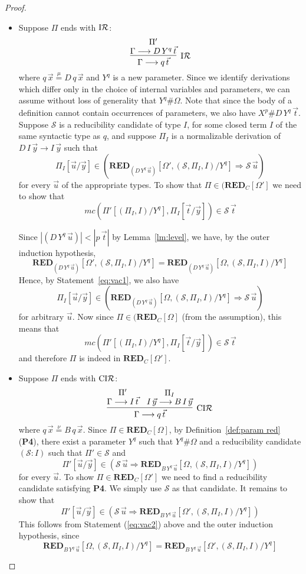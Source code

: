 \documentclass[preprint]{elsarticle}
\def\Sscr{{\mathcal S}}
\newcommand{\Seq}[2]{#1\longrightarrow #2}
\newcommand{\defmu}{\stackrel{\mu}{=}}
\newcommand{\defnu}{\stackrel{\nu}{=}}
\newcommand{\indR}{{\rm I}{\cal R}}
\newcommand{\coindR}{{\rm CI}{\cal R}}
\def\RED{{\mathbf{RED}}}
\begin{document}
\begin{proof}
\begin{itemize}
\item Suppose $\Pi$ ends with $\indR$:
$$
\infer[\indR]
{\Seq {\Gamma} {q\,\vec t}}
{\deduce{\Seq \Gamma {D\,Y^q\,\vec t}}{\Pi'}}
$$
where $q\,\vec x \defmu D\,q\,\vec x$ and $Y^q$ is a new parameter.
Since we identify derivations which differ only in the choice of
internal variables and parameters, we can assume without loss of generality
that $Y^q \# \Omega$. Note that since the body of a definition cannot
contain occurrences of parameters, we also have $X^p \# D\,Y^q\,\vec t$. 
Suppose $\Sscr$ is a reducibility candidate of type $I$, for some
closed term $I$ of the same syntactic type as $q$, and suppose
$\Pi_I$ is a normalizable derivation of $\Seq {D\,I\,\vec y}{I\,\vec y}$
such that
\begin{equation}
\label{eq:vac1}
\Pi_I[\vec u/\vec y] \in (
\RED_{(D\,Y^q\,\vec u)}[\Omega', (\Sscr,\Pi_I, I)/Y^q] \Rightarrow \Sscr
\,\vec u) 
\end{equation}
for every $\vec u$ of the appropriate types. To show that $\Pi \in (\RED_C[\Omega']$
we need to show that 
$$mc(\Pi'[(\Pi_I,I)/Y^q], \Pi_I[\vec t/ \vec y]) \in \Sscr\,\vec t$$ 

Since $|(D\,Y^q\,\vec u)| < |p\,\vec t|$ by Lemma~\ref{lm:level}, we have, by the outer induction hypothesis, 
$$
\RED_{(D\,Y^q\,\vec u)}[\Omega', (\Sscr,\Pi_I, I)/Y^q] 
=
\RED_{(D\,Y^q\,\vec u)}[\Omega, (\Sscr,\Pi_I, I)/Y^q] 
$$
Hence, by Statement~\ref{eq:vac1}, we also have
$$
\Pi_I[\vec u/\vec y] \in (
\RED_{(D\,Y^q\,\vec u)}[\Omega, (\Sscr,\Pi_I, I)/Y^q] \Rightarrow \Sscr \,\vec u)
$$
for arbitrary $\vec u$.  
Now since $\Pi \in (\RED_C[\Omega]$ (from the assumption), this means
that 
$$
mc(\Pi'[(\Pi_I,I)/Y^q], \Pi_I[\vec t/ \vec y]) \in \Sscr\,\vec t
$$
and therefore $\Pi$ is indeed in $\RED_C[\Omega']$. 

\item Suppose $\Pi$ ends with $\coindR$:
$$
\infer[\coindR]
{\Seq \Gamma {q\,\vec t}}
{
  \deduce{\Seq \Gamma {I\,\vec t}}{\Pi'}
  &
  \deduce
  {\Seq {I\,\vec y}{B\,I\,\vec y}}
  {\Pi_I}
}
$$
where $q\,\vec x \defnu B\,q\,\vec x$. 
Since $\Pi \in \RED_C[\Omega]$, by Definition~\ref{def:param red} ({\bf P4}),
there exist a parameter $Y^q$ such
that $Y^q \# \Omega$ and a reducibility candidate $(\Sscr : I)$
such that $\Pi' \in \Sscr$ and 
\begin{equation}
\label{eq:vac2}
\Pi'[\vec u/\vec y] \in (\Sscr\,\vec u \Rightarrow 
\RED_{B\,Y^q\,\vec u}[\Omega, (\Sscr,\Pi_I,I)/Y^q])
\end{equation}
for every $\vec u$. 
To show $\Pi \in \RED_C[\Omega']$ we need to find a reducibility
candidate satisfying {\bf P4}. We simply use $\Sscr$ as that candidate.
It remains to show that
$$
\Pi'[\vec u/\vec y] \in (\Sscr\,\vec u \Rightarrow 
\RED_{B\,Y^q\,\vec u}[\Omega', (\Sscr,\Pi_I,I)/Y^q])
$$
This follows from Statement (\ref{eq:vac2}) above and
the outer induction hypothesis, since 
$$\RED_{B\,Y^q\,\vec u}[\Omega, (\Sscr,\Pi_I,I)/Y^q]
= \RED_{B\,Y^q\,\vec u}[\Omega', (\Sscr,\Pi_I,I)/Y^q]$$
\end{itemize}


\end{proof}
\end{document}
